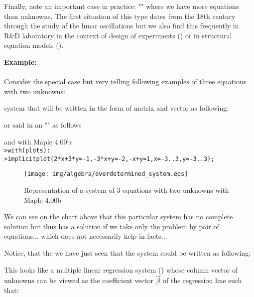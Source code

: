 Finally, note an important case in practice: "" where we have more equations than unknowns. The first situation of this type dates from the 18th century through the study of the lunar oscillations but we also find this frequently in R\&D laboratory in the context of design of experiments () or in structural equation models ().

	\begin{tcolorbox}[colframe=black,colback=white,sharp corners]
\textbf{{\Large {}}Example:}\\\\
Consider the special case but very telling following examples of three equations with two unknowns:
	
system that will be written in the form of matrix and vector as following:
	
or said in an "" as follows
	
and with Maple 4.00b:\\

\texttt{>with(plots):}\\
\texttt{>implicitplot({2*x+3*y=-1,-3*x+y=-2,-x+y=1},x=-3..3,y=-3..3);}
	\end{tcolorbox}

	\begin{tcolorbox}[colframe=black,colback=white,sharp corners]
	\begin{figure}[H]
	\centering
	\texttt{[image: img/algebra/overdetermined\_system.eps]}
	\caption{Representation of a system of 3 equations with two unknowns with Maple 4.00b}
	\end{figure}
	
	We can see on the chart above that this particular system has no complete solution but thus has a  solution if we take only the problem by pair of equations... which does not necessarily help in facts...
	\end{tcolorbox}

	Notice, that the we have just seen that the system could be written as following:
	
	This looks like a multiple linear regression system () whose column vector of unknowns can be viewed as the coefficient vector $\vec{\beta}$ of the regression line such that:
	
